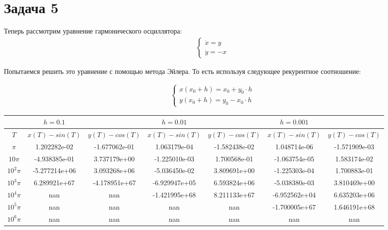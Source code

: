 \documentclass[a4paper,12pt]{article}
\begin{document}
  
\newpage
  \section*{Задача 5}

  Теперь рассмотрим уравнение гармонического осциллятора:
  \begin{align*}
    \left\{
      \begin{array}{c}
        \dot x=y
        \\
        \dot y=-x
      \end{array}
    \right.
  \end{align*}
  
  Попытаемся решить это уравнение с помощью метода Эйлера. То есть используя следующее рекурентное соотношение:

  \begin{align*}
    \left\{
      \begin{array}{c}
        x(x_0+h)=x_0+y_0 \cdot h
        \\
        y(x_0+h)=y_0-x_0 \cdot h
      \end{array}
    \right.
  \end{align*}
  
  \begin{table}[htb]
    \begin{center}
      \begin{tabular}{|c|c|c|c|c|c|c|}
      \hline
      &$h=0.1$&&$h=0.01$&&$h=0.001$&\\
      \hline
      $T$&$x(T)-sin(T)$&$y(T)-cos(T)$&$x(T)-sin(T)$&$y(T)-cos(T)$&$x(T)-sin(T)$&$y(T)-cos(T)$\\
      \hline
      $\pi$&1.202282e-02&-1.677062e-01&1.063179e-04 &-1.582438e-02&1.048714e-06 &-1.571909e-03\\
      \hline
      $10\pi$&-4.938385e-01&3.737179e+00&-1.225010e-03 &1.700568e-01&-1.063754e-05 &1.583174e-02\\
      \hline
      $10^2\pi$&-5.277214e+06&3.093268e+06&-5.036450e-02&3.809691e+00&-1.225303e-04&1.700883e-01\\
      \hline
      $10^3\pi$&6.289921e+67&-4.178951e+67&-6.929947e+05&6.593824e+06&-5.038380e-03&3.810469e+00\\
      \hline
      $10^4\pi$&nan&nan&-1.421995e+68&8.211133e+67&-6.952562e+04&6.635203e+06\\
      \hline
      $10^5\pi$&nan&nan&nan&nan&-1.700005e+67&1.646191e+68\\
      \hline
      $10^6\pi$&nan&nan&nan&nan&nan&nan
      \\
      \hline
      \end{tabular}
    \end{center}
  \end{table}
  
\end{document}
